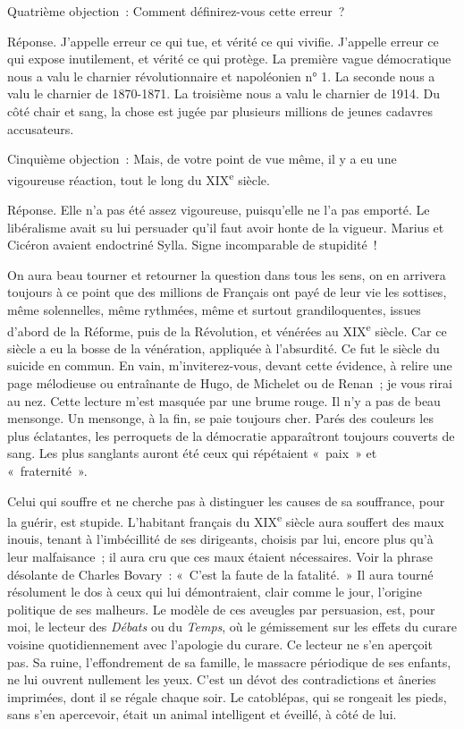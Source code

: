 \documentclass[french,twoside]{book} %
\begin{document}
Quatrième objection : Comment définirez-vous cette erreur ?\par
Réponse. J’appelle erreur ce qui tue, et vérité ce qui vivifie. J’appelle erreur ce qui expose inutilement, et vérité ce qui protège. La première vague démocratique nous a valu le charnier révolutionnaire et napoléonien n° 1. La seconde nous a valu le charnier de 1870-1871. La troisième nous a valu le charnier de 1914. Du côté chair et sang, la chose est jugée par plusieurs millions de jeunes cadavres accusateurs.\par
Cinquième objection : Mais, de votre point de vue même, il y a eu une vigoureuse réaction, tout le long du XIX\textsuperscript{e} siècle.\par
Réponse. Elle n’a pas été assez vigoureuse, puisqu’elle ne l’a pas emporté. Le libéralisme avait su lui persuader qu’il faut avoir honte de la vigueur. Marius et Cicéron avaient endoctriné Sylla. Signe incomparable de stupidité !\par
On aura beau tourner et retourner la question dans tous les sens, on en arrivera toujours à ce point que des millions de Français ont payé de leur vie les sottises, même solennelles, même rythmées, même et surtout grandiloquentes, issues d’abord de la Réforme, puis de la Révolution, et vénérées au XIX\textsuperscript{e} siècle. Car ce siècle a eu la bosse de la vénération, appliquée à l’absurdité. Ce fut le siècle du suicide en commun. En vain, m’inviterez-vous, devant cette évidence, à relire une page mélodieuse ou entraînante de Hugo, de Michelet ou de Renan ; je vous rirai au nez. Cette lecture m’est masquée par une brume rouge. Il n’y a pas de beau mensonge. Un mensonge, à la fin, se paie toujours cher. Parés des couleurs les plus éclatantes, les perroquets de la démocratie apparaîtront toujours couverts de sang. Les plus sanglants auront été ceux qui répétaient « paix » et « fraternité ».\par
Celui qui souffre et ne cherche pas à distinguer les causes de sa souffrance, pour la guérir, est stupide. L’habitant français du XIX\textsuperscript{e} siècle aura souffert des maux inouis, tenant à l’imbécillité de ses dirigeants, choisis par lui, encore plus qu’à leur malfaisance ; il aura cru que ces maux étaient nécessaires. Voir la phrase désolante de Charles Bovary : « C’est la faute de la fatalité. » Il aura tourné résolument le dos à ceux qui lui démontraient, clair comme le jour, l’origine politique de ses malheurs. Le modèle de ces aveugles par persuasion, est, pour moi, le lecteur des {\itshape Débats} ou du {\itshape Temps}, où le gémissement sur les effets du curare voisine quotidiennement avec l’apologie du curare. Ce lecteur ne s’en aperçoit pas. Sa ruine, l’effondrement de sa famille, le massacre périodique de ses enfants, ne lui ouvrent nullement les yeux. C’est un dévot des contradictions et âneries imprimées, dont il se régale chaque soir. Le catoblépas, qui se rongeait les pieds, sans s’en apercevoir, était un animal intelligent et éveillé, à côté de lui.\par
\end{document}
